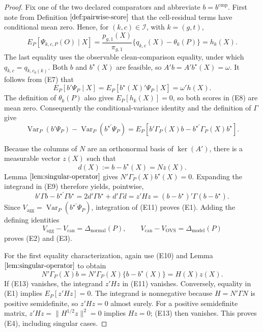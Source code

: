 \documentclass{article}
\begin{document}
\begin{proof}
Fix one of the two declared comparators and abbreviate \(b=b^{\mathrm{cmp}}\).  First note from Definition \(\ref{def:pairwise-score}\) that the cell-residual terms have conditional mean zero.  Hence, for \((k,c)\in\mathcal I\), with \(k=(g,t)\),
\[
 E_P[\Psi_{k,c,P}(O)\mid X]
 =\frac{p_{g,1}(X)}{\pi_{g,1}}\{q_{k,c}(X)-\theta_k(P)\}
 =h_k(X).
\tag{E7}
\]
The last equality uses the observable clean-comparison equality, under which \(q_{k,c}=q_{k,c_0(k)}\).  Both \(b\) and \(b^\star(X)\) are feasible, so \(A'b=A'b^\star(X)=\omega\).  It follows from (E7) that
\[
 E_P[b'\Psi_P\mid X]=E_P[b^\star(X)'\Psi_P\mid X]=\omega'h(X).
\tag{E8}
\]
The definition of \(\theta_k(P)\) also gives \(E_P[h_k(X)]=0\), so both scores in (E8) are mean zero.
Consequently the conditional-variance identity and the definition of \(\Gamma\) give
\[
 \operatorname{Var}_P(b'\Psi_P)-\operatorname{Var}_P(b^{\star\prime}\Psi_P)
 =E_P[b'\Gamma_P(X)b-b^{\star\prime}\Gamma_P(X)b^\star].
\tag{E9}
\]

Because the columns of \(N\) are an orthonormal basis of \(\ker(A')\), there is a measurable vector \(z(X)\) such that
\[
 d(X):=b-b^\star(X)=Nz(X).
\tag{E10}
\]
Lemma \(\ref{lem:singular-operator}\) gives \(N'\Gamma_P(X)b^\star(X)=0\).  Expanding the integrand in (E9) therefore yields, pointwise,
\[
 b'\Gamma b-b^{\star\prime}\Gamma b^\star
 =2d'\Gamma b^\star+d'\Gamma d
 =z'H z
 =(b-b^\star)'\Gamma(b-b^\star).
\tag{E11}
\]
Since \(V_{\mathrm{agg}}=\operatorname{Var}_P(b^{\star\prime}\Psi_P)\), integration of (E11) proves (E1).  Adding the defining identities
\[
 V_{\mathrm{agg}}-V_{\mathrm{can}}=\Delta_{\mathrm{normal}}(P),
 \qquad
 V_{\mathrm{can}}-V_{\mathrm{OVS}}=\Delta_{\mathrm{model}}(P)
\tag{E12}
\]
proves (E2) and (E3).

For the first equality characterization, again use (E10) and Lemma \(\ref{lem:singular-operator}\) to obtain
\[
 N'\Gamma_P(X)b
 =N'\Gamma_P(X)\{b-b^\star(X)\}
 =H(X)z(X).
\tag{E13}
\]
If (E13) vanishes, the integrand \(z'Hz\) in (E11) vanishes.  Conversely, equality in (E1) implies \(E_P[z'Hz]=0\).  The integrand is nonnegative because \(H=N'\Gamma N\) is positive semidefinite, so \(z'H z=0\) almost surely.  For a positive semidefinite matrix, \(z'Hz=\|H^{1/2}z\|^2=0\) implies \(Hz=0\); (E13) then vanishes.  This proves (E4), including singular cases.


\end{proof}
\end{document}
